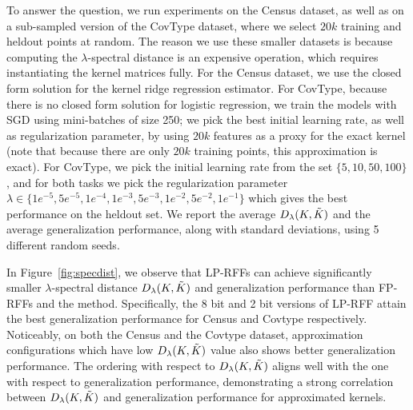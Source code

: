 To answer the question, we run experiments on the Census dataset, as well as on a sub-sampled version of the CovType dataset, where we select $20k$ training and heldout points at random.  The reason we use these smaller datasets is because computing the $\lambda$-spectral distance is an expensive operation, which requires instantiating the kernel matrices fully.  For the Census dataset, we use the closed form solution for the kernel ridge regression estimator.  For CovType, because there is no closed form solution for logistic regression, we train the models with SGD using mini-batches of size 250; we pick the best initial learning rate, as well as regularization parameter, by using $20k$ \Nystrom features as a proxy for the exact kernel (note that because there are only $20k$ training points, this \Nystrom approximation is exact). For CovType, we pick the initial learning rate from the set $\{5, 10, 50, 100\}$, and for both tasks we pick the regularization parameter $\lambda \in \{1e^{-5}, 5e^{-5}, 1e^{-4}, 1e^{-3}, 5e^{-3}, 1e^{-2}, 5e^{-2}, 1e^{-1}\}$ which gives the best performance on the heldout set. We report the average $D_{\lambda}(K,\tilde{K})$ and the average generalization performance, along with standard deviations, using 5 different random seeds.

In Figure~\ref{fig:specdist}, we observe that LP-RFFs can achieve significantly smaller $\lambda$-spectral distance $D_{\lambda}(K,\tilde{K})$ and generalization performance than FP-RFFs and the \Nystrom method. Specifically, the 8 bit and 2 bit versions of LP-RFF attain the best generalization performance for Census and Covtype respectively. Noticeably, on both the Census and the Covtype dataset, approximation configurations which have low $D_{\lambda}(K,\tilde{K})$ value also shows better generalization performance. The ordering with respect to $D_{\lambda}(K,\tilde{K})$ aligns well with the one with respect to generalization performance, demonstrating a strong correlation between $D_{\lambda}(K,\tilde{K})$ and generalization performance for approximated kernels. 

